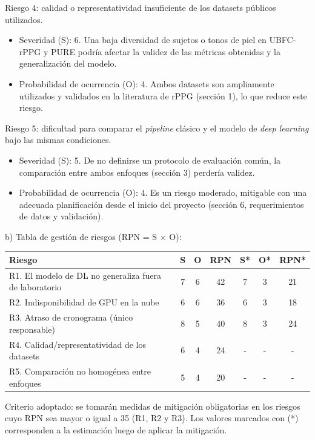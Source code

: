 \documentclass[
11pt, %
]{charter}
\begin{document}
	Riesgo 4: calidad o representatividad insuficiente de los datasets públicos utilizados.
	\begin{itemize}
		\item Severidad (S): 6. Una baja diversidad de sujetos o tonos de piel en UBFC-rPPG y PURE podría afectar la validez de las métricas obtenidas y la generalización del modelo.
		\item Probabilidad de ocurrencia (O): 4. Ambos datasets son ampliamente utilizados y validados en la literatura de rPPG (sección 1), lo que reduce este riesgo.
	\end{itemize}
	
	Riesgo 5: dificultad para comparar el \textit{pipeline} clásico y el modelo de \textit{deep learning} bajo las mismas condiciones.
	\begin{itemize}
		\item Severidad (S): 5. De no definirse un protocolo de evaluación común, la comparación entre ambos enfoques (sección 3) perdería validez.
		\item Probabilidad de ocurrencia (O): 4. Es un riesgo moderado, mitigable con una adecuada planificación desde el inicio del proyecto (sección 6, requerimientos de datos y validación).
	\end{itemize}
	
	b) Tabla de gestión de riesgos (RPN = S $\times$ O):
	
	\begin{table}[htpb]
		\centering
		\begin{tabularx}{\linewidth}{@{}|X|c|c|c|c|c|c|@{}}
			\hline
			\rowcolor[HTML]{C0C0C0} 
			Riesgo & S & O & RPN & S* & O* & RPN* \\ \hline
			R1. El modelo de DL no generaliza fuera de laboratorio & 7 & 6 & 42 & 7 & 3 & 21 \\ \hline
			R2. Indisponibilidad de GPU en la nube             & 6 & 6 & 36 & 6 & 3 & 18 \\ \hline
			R3. Atraso de cronograma (único responsable)        & 8 & 5 & 40 & 8 & 3 & 24 \\ \hline
			R4. Calidad/representatividad de los datasets       & 6 & 4 & 24 & -  & -  & -  \\ \hline
			R5. Comparación no homogénea entre enfoques         & 5 & 4 & 20 & -  & -  & -  \\ \hline
		\end{tabularx}%
	\end{table}
	
	Criterio adoptado: se tomarán medidas de mitigación obligatorias en los riesgos cuyo RPN sea mayor o igual a 35 (R1, R2 y R3). Los valores marcados con (*) corresponden a la estimación luego de aplicar la mitigación.
	
\end{document}
